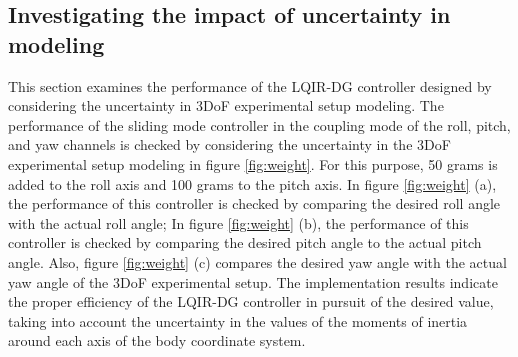 \documentclass[3p,times]{elsarticle}
\begin{document}
\subsection{Investigating the impact of uncertainty in modeling }
\noindent This section examines the performance of the LQIR-DG controller designed by considering the uncertainty in 3DoF experimental setup modeling. The performance of the sliding mode controller in the coupling mode of the roll, pitch, and yaw channels is checked by considering the uncertainty in the 3DoF experimental setup modeling in figure \ref{fig:weight}. For this purpose, 50 grams is added to the roll axis and 100 grams to the pitch axis. In figure \ref{fig:weight} (a), the performance of this controller is checked by comparing the desired roll angle with the actual roll angle; In figure \ref{fig:weight} (b), the performance of this controller is checked by comparing the desired pitch angle to the actual pitch angle. Also, figure \ref{fig:weight} (c) compares the desired yaw angle with the actual yaw angle of the 3DoF experimental setup. The implementation results indicate the proper efficiency of the LQIR-DG controller in pursuit of the desired value, taking into account the uncertainty in the values of the moments of inertia around each axis of the body coordinate system.
\end{document}
